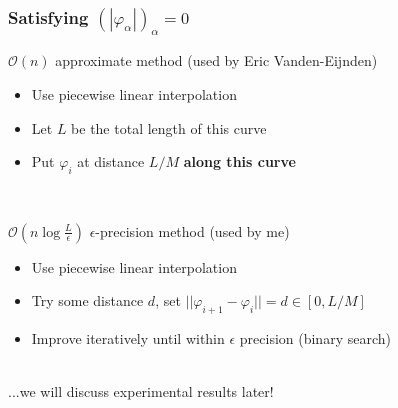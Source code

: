 \documentclass{beamer}
\renewcommand{\phi}{\varphi}
\renewcommand{\(}{\left(}
\renewcommand{\)}{\right)}
\begin{document}
\begin{frame}
\frametitle{Satisfying $(|\phi_\alpha|)_\alpha=0$}
\begin{block}{$\mathcal{O}(n)$ approximate method (used by Eric Vanden-Eijnden)}
\begin{itemize}
\item Use piecewise linear interpolation
\item Let $L$ be the total length of this curve
\item Put $\phi_i$ at distance $L/M$ \textbf{along this curve}
\end{itemize}
\end{block}
~\\
\begin{block}{$\mathcal{O}(n\log \frac{L}{\epsilon})$ $\epsilon$-precision method (used by me)}
\begin{itemize}
\item Use piecewise linear interpolation
\item Try some distance $d$, set $||\phi_{i+1}-\phi_i|| = d \in [0, L/M]$
\item Improve iteratively until within $\epsilon$ precision (binary search)
\end{itemize}
\end{block}
~\\
...we will discuss experimental results later!
\end{frame}

\end{document}
